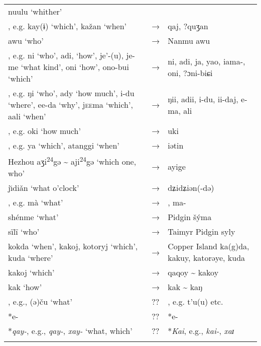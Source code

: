 \begin{table}
\begin{tabularx}{\textwidth}{QlQ}
nuulu ‘whither’\\
, e.g.  kay(ɨ) ‘which’, kažan ‘when’ & → &  qaj, ?quʒan\\
 awu ‘who’ & → & Nanmu  awu\\
, e.g.  ni ‘who’, adi, ‘how’, je’-(u), je-me ‘what kind’,  oni ‘how’,  ono-bui ‘which’ & → &  ni, adi, ja, yao, iama-,  oni, ?ɔni{}-biɕi\\
, e.g.  ŋi ‘who’, ady ‘how much’,  i-du ‘where’, ee-da ‘why’,  j\textsc{ee}ma ‘which’, aali ‘when’ & → &  ŋii, adii, i-du, ii-daj, e-ma, ali\\
, e.g.  oki ‘how much’ & → &  uki\\
, e.g.  ya ‘which’, atanggi ‘when’ & → &  iətin\\
Hezhou  aʒi\textsuperscript{24}gə {\textasciitilde} aji\textsuperscript{24}gə ‘which one, who’ & → &  ayige\\
 j\u{\i}diǎn ‘what o’clock’ & → &  dʑidʑiən(-də)\\
, e.g.  mà ‘what’ & → & ,  ma-\\
 shénme ‘what’ & → &  Pidgin  šýma\\
 sïlï ‘who’ & → & Taimyr Pidgin  syly\\
 kokda ‘when’, kakoj, kotoryj ‘which’, kuda ‘where’ & → & Copper Island  ka(g)da, kakuy, katorəye, kuda\\
 kakoj ‘which’ & → &  qaqoy {\textasciitilde} kakoy\\
 kak ‘how’ & → &  kak {\textasciitilde} kaŋ\\
, e.g.,  (ə)ču ‘what’ & ?? & , e.g.  t’u(u) etc.\\
 *e- & ?? &  *e-\\
 *\textit{qay-}, e.g.,  \textit{qay-},  \textit{xay{}-} ‘what, which’ & ?? &  *\textit{Kai}, e.g.,  \textit{kai-},  \textit{xaɪ}\\
\lspbottomrule
\end{tabularx}
\end{table}

